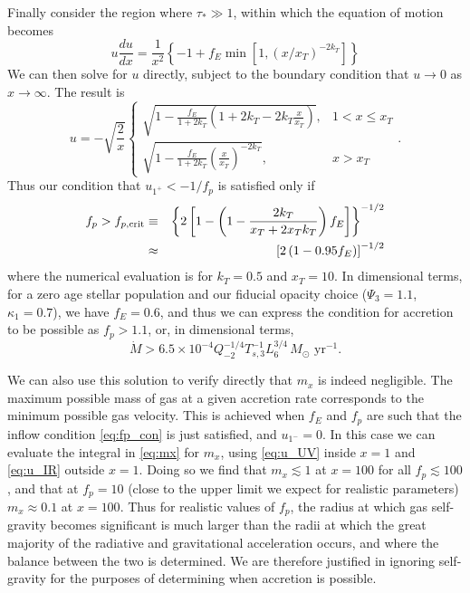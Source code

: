 \documentclass[useAMS,usenatbib]{mn2e}
\begin{document}
Finally consider the region where $\tau_* \gg 1$, within which the equation of motion becomes
\begin{equation}
u \frac{du}{dx} = \frac{1}{x^2} \left\{-1 + f_E \min\left[1,\left(x/x_T\right)^{-2 k_T}\right]\right\}
\end{equation}
We can then solve for $u$ directly, subject to the boundary condition that $u\rightarrow 0$ as $x\rightarrow \infty$. The result is
\begin{equation}
\label{eq:u_IR}
u = -\sqrt{\frac{2}{x}}
\left\{
\begin{array}{ll}
\sqrt{1 - \frac{f_E}{1+2 k_T}\left(1+2k_T -2 k_T \frac{x}{x_T}\right)}, & 1 < x \leq x_T \\
\sqrt{1 - \frac{f_E}{1+2 k_T}\left(\frac{x}{x_T}\right)^{-2k_T}}, & x > x_T
\end{array}
\right..
\end{equation}
Thus our condition that $u_{1^+} < -1/f_p$ is satisfied only if
\begin{eqnarray}
f_p > f_{p,\rm crit} & \equiv & \left\{2\left[1-\left(1 - \frac{2 k_T}{x_T+2 x_T k_T}\right)f_E\right]\right\}^{-1/2}
\nonumber \\
& \approx & \left[2\left(1-0.95 f_E\right)\right]^{-1/2}
\label{eq:fp_con}
\end{eqnarray}
where the numerical evaluation is for $k_T = 0.5$ and $x_T = 10$. In dimensional terms, for a zero age stellar population and our fiducial opacity choice ($\Psi_3 = 1.1$, $\kappa_1 = 0.7$), we have $f_E = 0.6$, and thus we can express the condition for accretion to be possible as $f_p > 1.1$, or, in dimensional terms,
\begin{equation}
\dot{M} > 6.5\times 10^{-4} Q_{-2}^{-1/4} T_{s,3}^{-1} L_6^{3/4}\,M_\odot\mbox{ yr}^{-1}.
\end{equation}

We can also use this solution to verify directly that $m_x$ is indeed negligible. The maximum possible mass of gas at a given accretion rate corresponds to the minimum possible gas velocity. This is achieved when $f_E$ and $f_p$ are such that the inflow condition \autoref{eq:fp_con} is just satisfied, and $u_{1^-} = 0$. In this case we can evaluate the integral in \autoref{eq:mx} for $m_x$, using \autoref{eq:u_UV} inside $x=1$ and \autoref{eq:u_IR} outside $x=1$. Doing so we find that $m_x \lesssim 1$ at $x=100$ for all $f_p \lesssim 100$, and that at $f_p = 10$ (close to the upper limit we expect for realistic parameters) $m_x \approx 0.1$ at $x=100$. Thus for realistic values of $f_p$, the radius at which gas self-gravity becomes significant is much larger than the radii at which the great majority of the radiative and gravitational acceleration occurs, and where the balance between the two is determined. We are therefore justified in ignoring self-gravity for the purposes of determining when accretion is possible.
\end{document}
